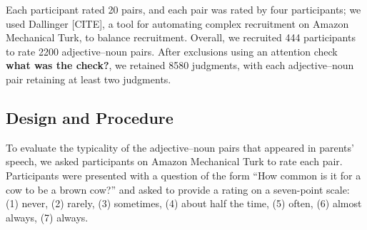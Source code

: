 \documentclass[10pt, letterpaper]{article}
\begin{document}
Each participant rated 20 pairs, and each pair was rated by four
participants; we used Dallinger {[}CITE{]}, a tool for automating
complex recruitment on Amazon Mechanical Turk, to balance recruitment.
Overall, we recruited 444 participants to rate 2200 adjective--noun
pairs. After exclusions using an attention check \textbf{what was the
check?}, we retained 8580 judgments, with each adjective--noun pair
retaining at least two judgments.

\hypertarget{design-and-procedure}{%
\subsection{Design and Procedure}\label{design-and-procedure}}

To evaluate the typicality of the adjective--noun pairs that appeared in
parents' speech, we asked participants on Amazon Mechanical Turk to rate
each pair. Participants were presented with a question of the form ``How
common is it for a cow to be a brown cow?'' and asked to provide a
rating on a seven-point scale: (1) never, (2) rarely, (3) sometimes, (4)
about half the time, (5) often, (6) almost always, (7) always.
\end{document}
